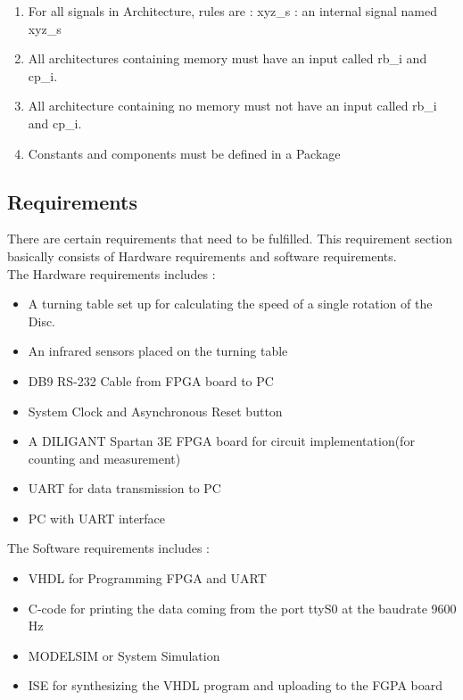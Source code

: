\documentclass[12pt,a4paper]{article}
\begin{document}
\begin{enumerate}
\item For all signals in Architecture, rules are : xyz\_s  : an internal signal named xyz\_s\
\item All architectures containing memory must have an input called rb\_i and cp\_i.\
\item All architecture containing no memory must not have an input called rb\_i  and cp\_i.\
\item Constants and components must be defined in a Package\


\end{enumerate}


\subsection{Requirements}
There are certain requirements that need to be fulfilled. This requirement section basically consists of Hardware requirements and software requirements.\\

The Hardware requirements includes :\
\begin{itemize}
\item A turning table set up for calculating the speed of a single rotation of the Disc.\
\item An infrared sensors placed on the turning table\
\item DB9 RS-232 Cable from FPGA board to PC\
\item System Clock and Asynchronous Reset button\
\item A DILIGANT Spartan 3E FPGA board for circuit implementation(for counting and measurement)\
\item UART for data transmission to PC\
\item PC with UART interface\
\end{itemize}

The Software requirements includes :\
\begin{itemize}
\item VHDL for Programming FPGA and UART\
\item C-code for printing the data coming from the port ttyS0 at the baudrate 9600 Hz\
\item MODELSIM or System Simulation\
\item ISE for synthesizing the VHDL program and uploading to the FGPA board\
\end{itemize}

\newpage

\renewcommand{\baselinestretch}{1.5} %
\end{document}
